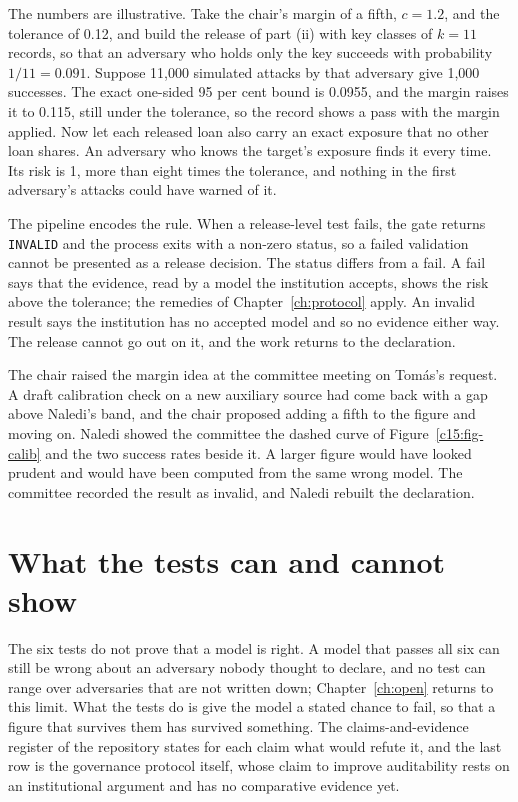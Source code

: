 \begin{example}\label{c15:ex-margin}
The numbers are illustrative. Take the chair's margin of a fifth, $c = 1.2$, and the
tolerance of 0.12, and build the release of part (ii) with key classes of $k = 11$
records, so that an adversary who holds only the key succeeds with probability
$1/11 = 0.091$. Suppose 11,000 simulated attacks by that adversary give 1,000 successes.
The exact one-sided 95 per cent bound is 0.0955, and the margin raises it to 0.115, still
under the tolerance, so the record shows a pass with the margin applied. Now let each
released loan also carry an exact exposure that no other loan shares. An adversary who
knows the target's exposure finds it every time. Its risk is 1, more than eight times the
tolerance, and nothing in the first adversary's attacks could have warned of it.
\end{example}


The pipeline encodes the rule. When a release-level test fails, the gate returns
\texttt{INVALID} and the process exits with a non-zero status, so a failed
validation cannot be presented as a release decision.
The status differs from a fail. A fail says that the evidence, read by a model the
institution accepts, shows the risk above the tolerance; the remedies of
Chapter~\ref{ch:protocol} apply. An invalid result says the institution has no
accepted model and so no evidence either way. The release cannot go out on it, and
the work returns to the declaration.

The chair raised the margin idea at the committee meeting on Tomás's request. A
draft calibration check on a new auxiliary source had come back with a gap above
Naledi's band, and the chair proposed adding a fifth to the figure and moving on.
Naledi showed the committee the dashed curve of Figure~\ref{c15:fig-calib} and the
two success rates beside it. A larger figure would have looked prudent and would
have been computed from the same wrong model. The committee recorded the result as
invalid, and Naledi rebuilt the declaration.

\section{What the tests can and cannot show}

The six tests do not prove that a model is right. A model that passes all six can
still be wrong about an adversary nobody thought to declare, and no test can range
over adversaries that are not written down; Chapter~\ref{ch:open} returns to this
limit. What the tests do is give the model a stated chance to fail, so that a
figure that survives them has survived something. The claims-and-evidence register
of the repository states for each claim what would refute it, and the last row is
the governance protocol itself, whose claim to improve auditability rests on an
institutional argument and has no comparative evidence yet.

